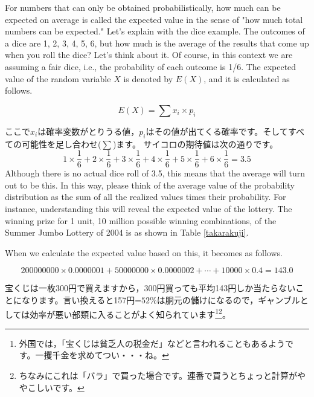 \documentclass{ltjbook}
\begin{document}
For numbers that can only be obtained probabilistically, how much can be expected on average is called the expected value in the sense of "how much total numbers can be expected."
Let's explain with the dice example. The outcomes of a dice are 1, 2, 3, 4, 5, 6, but how much is the average of the results that come up when you roll the dice? Let's think about it. Of course, in this context we are assuming a fair dice, i.e., the probability of each outcome is 1/6.
The expected value of the random variable $X$ is denoted by $E(X)$, and it is calculated as follows.

\[ E(X) = \sum x_i \times p_i \]

ここで$x_i$は確率変数がとりうる値，$p_i$はその値が出てくる確率です。そしてすべての可能性を足し合わせ($\sum$)ます。
サイコロの期待値は次の通りです。
\[1\times\frac{1}{6}+
	2\times\frac{1}{6}+
	3\times\frac{1}{6}+
	4\times\frac{1}{6}+
	5\times\frac{1}{6}+
	6\times\frac{1}{6}
	=3.5\]
Although there is no actual dice roll of 3.5, this means that the average will turn out to be this. In this way, please think of the average value of the probability distribution as the sum of all the realized values times their probability.
For instance, understanding this will reveal the expected value of the lottery. The winning prize for 1 unit, 10 million possible winning combinations, of the Summer Jumbo Lottery of 2004 is as shown in Table \ref{takarakuji}.



When we calculate the expected value based on this, it becomes as follows.

\[200000000 \times 0.0000001 + 50000000 \times 0.0000002 + \cdots + 10000\times0.4=143.0 \]

宝くじは一枚300円で買えますから，300円買っても平均143円しか当たらないことになります。言い換えると157円=$52\%$は胴元の儲けになるので，ギャンブルとしては効率が悪い部類に入ることがよく知られています\footnote{外国では，「宝くじは貧乏人の税金だ」などと言われることもあるようです。一攫千金を求めてつい・・・ね。}\footnote{ちなみにこれは「バラ」で買った場合です。連番で買うとちょっと計算がややこしいです。}。
\end{document}
